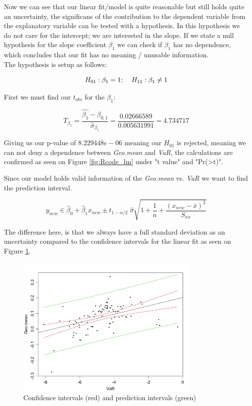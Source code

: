 \documentclass{article}
\begin{document}
Now we can see that our linear fit/model is quite reasonable but still holds quite an uncertainty, the significans of the contribution to the dependent variable from the explanatory variable can be tested with a hypothesis. In this hypothesis we do not care for the intercept; we are interested in the slope. If we state a null hypothesis for the slope coefficient $\beta_1$ we can check if $\beta_1$ has no dependence, which concludes that our fit has no meaning / unusable information. \\

The hypothesis is setup as follows:

\begin{equation}
H_{01}: \beta_1 =1 ; \hspace{4mm} H_{11}: \beta_1 \neq 1
\end{equation}

First we must find our $t_{obs}$ for the $\beta_1$: 

\begin{equation}
T_{\beta_1}=\frac{\hat{\beta_1}-\beta_{0,1}}{\hat{\sigma}_{\beta_1}} = \frac{0.02666589}{0.005631991}=4.734717
\end{equation}  

Giving us our p-value of $8.229448e-06$ meaning our $H_{01}$ is rejected, meaning we can not deny a dependence between \textit{Geo.mean} and \textit{VaR}, the calculations are confirmed as seen on Figure \ref{fig:Rcode_lm} under "t value" and "Pr(\textgreater \textbar t\textbar)". 

Since our model holds valid information of the \textit{Geo.mean} vs. \textit{VaR} we want to find the prediction interval.

\begin{equation}
{y}_{new} \in
\hat{\beta}_0+\hat{\beta}_1 x_{new} \pm 
t_{1-\alpha/2} \; \hat{\sigma}
\sqrt{
    1+\frac{1}{n}+ \frac{(x_{new}-\bar{x})^2}{S_{xx}}
    }
\end{equation}

The difference here, is that we always have a full standard deviation as an uncertainty compared to the confidence intervals for the linear fit as seen on Figure \ref{fig:CPInt}. 

\begin{figure}[h!]
\centering
\includegraphics[width=0.8\textwidth]{fig/CPInt.png}
\caption{Confidence intervals (red) and prediction intervals (green)}
\label{fig:CPInt}
\end{figure}
\end{document}
